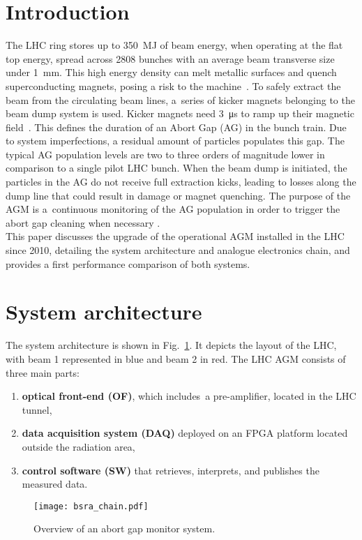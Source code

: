 \section{Introduction}
The LHC ring stores up to \SI{350}{MJ} of beam energy, when operating at the flat top energy, spread across 2808 bunches with an average beam transverse size under \SI{1}{mm}.
%
This high energy density can melt metallic surfaces and quench
superconducting magnets, posing a risk to the machine~\cite{LHC_report}.
%
To safely extract the beam from the circulating beam lines, a~series of kicker magnets belonging to the beam dump system is used. 
%
Kicker magnets need \SI{3}{\micro\second} to ramp up their magnetic field~\cite{beam_dump_system}.
%
This defines the duration of an Abort Gap (AG) in the bunch train.
%
Due to system imperfections, a residual amount of particles populates this gap.
%
The typical AG population levels are two to three orders of magnitude lower in comparison to a single pilot LHC bunch.
%
When the beam dump is initiated, the particles in the AG do not receive full
extraction kicks, leading to losses along the dump line that could result in damage or magnet quenching.
%
%
The purpose of the AGM is a~continuous monitoring of the AG population in order to trigger the abort gap cleaning when  necessary \cite{particles_in_ag}.
\\
This paper discusses the upgrade of the operational AGM installed in the LHC since 2010, detailing the system architecture and analogue electronics chain, and provides a first performance comparison  of both systems.

\section{System architecture}
The system architecture is shown in Fig.~\ref{fig:bsra_chain}.
%
It depicts the layout of the LHC, with beam 1 represented in blue and beam 2 in red.
%
The LHC AGM consists of three main parts:
%
\begin{enumerate}
    \item \textbf{optical front-end (OF)}, which includes~a pre-amplifier, located in the LHC tunnel,
    \item \textbf{data acquisition system (DAQ)} deployed on an FPGA platform located outside the radiation area,
    \item \textbf{control software (SW)} that retrieves, interprets, and publishes the measured data.
\end{enumerate}
%
\begin{figure}[!tbh]
    \centering
    \texttt{[image: bsra\_chain.pdf]}
    \caption{Overview of an abort gap monitor system.}
    \label{fig:bsra_chain}
\end{figure} 

